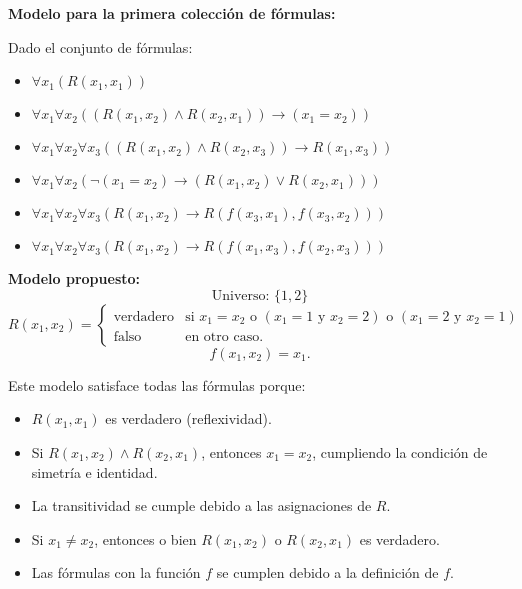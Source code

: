 \begin{solution}
    \textbf{Modelo para la primera colección de fórmulas:}

Dado el conjunto de fórmulas:

\begin{itemize}
    \item $\forall x_1 (R(x_1, x_1))$
    
    \item $\forall x_1 \forall x_2 ((R(x_1, x_2) \land R(x_2, x_1)) \to (x_1 = x_2))$
    
    \item $\forall x_1 \forall x_2 \forall x_3 ((R(x_1, x_2) \land R(x_2, x_3)) \to R(x_1, x_3))$
    
    \item $\forall x_1 \forall x_2 (\neg (x_1 = x_2) \to (R(x_1, x_2) \lor R(x_2, x_1)))$
    
    \item $\forall x_1 \forall x_2 \forall x_3 (R(x_1, x_2) \to R(f(x_3, x_1), f(x_3, x_2)))$
    
    \item $\forall x_1 \forall x_2 \forall x_3 (R(x_1, x_2) \to R(f(x_1, x_3), f(x_2, x_3)))$
\end{itemize}

\textbf{Modelo propuesto:}
\[
\text{Universo: } \{1, 2\}
\]
\[
R(x_1, x_2) = \left\{
    \begin{array}{ll}
        \text{verdadero} & \text{si } x_1 = x_2 \text{ o } (x_1 = 1 \text{ y } x_2 = 2) \text{ o } (x_1 = 2 \text{ y } x_2 = 1) \\
        \text{falso} & \text{en otro caso.}
    \end{array}
\right.
\]
\[
f(x_1, x_2) = x_1.
\]

Este modelo satisface todas las fórmulas porque:

\begin{itemize}
    \item \( R(x_1, x_1) \) es verdadero (reflexividad).
    \item Si \( R(x_1, x_2) \land R(x_2, x_1) \), entonces \( x_1 = x_2 \), cumpliendo la condición de simetría e identidad.
    \item La transitividad se cumple debido a las asignaciones de \( R \).
    \item Si \( x_1 \neq x_2 \), entonces o bien \( R(x_1, x_2) \) o \( R(x_2, x_1) \) es verdadero.
    \item Las fórmulas con la función \( f \) se cumplen debido a la definición de \( f \).


\end{itemize}
\end{solution}
